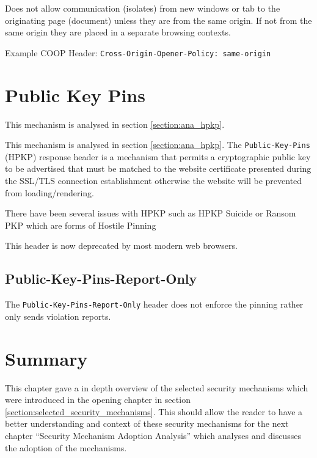 \documentclass{mscreport}
\begin{document}
\vspace{0.3cm} \noindent
Does not allow communication (isolates) from new windows or tab to the originating page (document) unless they are from the same origin. If not from the same origin they are placed in a separate browsing contexts.

\vspace{0.3cm} \noindent
Example COOP Header: \texttt{Cross-Origin-Opener-Policy: same-origin}

\section{Public Key Pins}
\label{section:bg_hpkp}

This mechanism is analysed in section \ref{section:ana_hpkp}.

\vspace{0.3cm} \noindent
This mechanism is analysed in section \ref{section:ana_hpkp}.
The \texttt{Public-Key-Pins} (HPKP) response header is a mechanism that permits a cryptographic public key to be advertised that must be matched to the website certificate presented during the SSL/TLS connection establishment otherwise the website will be prevented from loading/rendering.

\vspace{0.3cm} \noindent
There have been several issues with HPKP such as HPKP Suicide \cite{Chen2018-ft,Chuat2021-nf} or Ransom PKP \cite{Chuat2021-nf} which are forms of Hostile Pinning \cite{Evans2018-mi}

\vspace{0.3cm} \noindent
This header is now deprecated by most modern web browsers.

\subsection{Public-Key-Pins-Report-Only}
The \texttt{Public-Key-Pins-Report-Only} header does not enforce the pinning rather only sends violation reports.

\newpage

\section{Summary}

This chapter gave a in depth overview of the selected security mechanisms which were introduced in the opening chapter in section \ref{section:selected_security_mechanisms}. This should allow the reader to have a better understanding and context of these security mechanisms for the next chapter ``Security Mechanism Adoption Analysis'' which analyses and discusses the adoption of the mechanisms.
\end{document}
